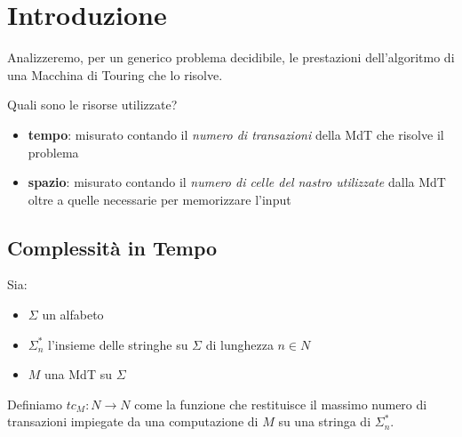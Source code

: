 \section{Introduzione}

Analizzeremo, per un generico problema decidibile, le prestazioni dell'algoritmo di una Macchina di Touring che lo risolve.

Quali sono le risorse utilizzate?

\begin{itemize}

	\item \textbf{tempo}: misurato contando il \textit{numero di transazioni} della MdT che risolve il problema

	\item \textbf{spazio}: misurato contando il \textit{numero di celle del nastro utilizzate} dalla MdT oltre a quelle necessarie per memorizzare l'input

\end{itemize}

\subsection{Complessità in Tempo}

Sia:
\begin{itemize}
	\item $\Sigma$ un alfabeto
	\item $\Sigma_n^\ast$ l'insieme delle stringhe su $\Sigma$ di lunghezza $n \in N$
	\item $M$ una MdT su $\Sigma$
\end{itemize}

Definiamo $tc_M : N \rightarrow N$ come la funzione che restituisce il massimo numero di transazioni impiegate da una computazione di $M$ su una stringa di $\Sigma_n^\ast$.

